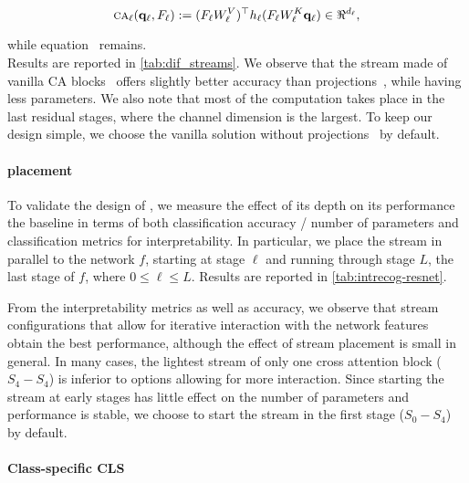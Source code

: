 \begin{equation}
	\ca_\ell(\vq_\ell, F_\ell) \defn (F_\ell W^V_\ell)\tran h_\ell(F_\ell W^K_\ell \vq_\ell)\in 
    \real^{d_\ell},
\label{eq:proj_ca}
\end{equation}

while equation~ remains.\\

\noindent Results are reported in \autoref{tab:dif_streams}. We observe that the stream made of 
vanilla CA blocks~ offers slightly better accuracy than projections~, while 
having less parameters. We also note that most of the computation takes place in the last residual 
stages, where the channel dimension is the largest. To keep our design simple, we choose the 
vanilla solution without projections~ by default.

\paragraph{\Ours placement}
\label{ab:placement}

To validate the design of \Ours, we measure the effect of its depth on its performance \vs the 
baseline \gap in terms of both classification accuracy / number of parameters and classification 
metrics for interpretability. In particular, we place the stream in parallel to the network $f$, 
starting at stage $\ell$ and running through stage $L$, the last stage of $f$, where $0 \le \ell 
\le L$. Results are reported in \autoref{tab:intrecog-resnet}.



\noindent From the interpretability metrics as well as accuracy, we observe that stream 
configurations that allow for iterative interaction with the network features obtain the best 
performance, although the effect of stream placement is small in general. In many cases, the 
lightest stream of only one cross attention block ($S_4-S_4$) is inferior to options allowing for 
more interaction. 
Since starting the stream at early stages has little effect on the number of parameters and 
performance is stable, we choose to start the stream in the first stage ($S_0-S_4$) by default.


\paragraph{Class-specific CLS}

